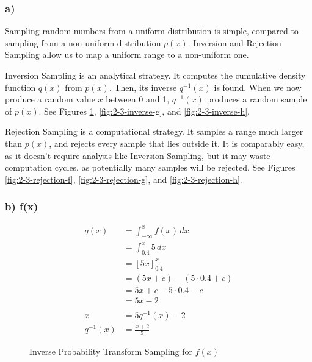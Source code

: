 \subsubsection*{a)}

Sampling random numbers from a uniform distribution is simple, compared to sampling from a non-uniform distribution $p(x)$. Inversion and Rejection Sampling allow us to map a uniform range to a non-uniform one.

Inversion Sampling is an analytical strategy. It computes the cumulative density function $q(x)$ from $p(x)$. Then, its inverse $q^{-1}(x)$ is found. When we now produce a random value $x$ between 0 and 1, $q^{-1}(x)$ produces a random sample of $p(x)$. See Figures \ref{fig:2-3-inverse-f}, \ref{fig:2-3-inverse-g}, and \ref{fig:2-3-inverse-h}.

Rejection Sampling is a computational strategy. It samples a range much larger than $p(x)$, and rejects every sample that lies outside it. It is comparably easy, as it doesn't require analysis like Inversion Sampling, but it may waste computation cycles, as potentially many samples will be rejected. See Figures \ref{fig:2-3-rejection-f}, \ref{fig:2-3-rejection-g}, and \ref{fig:2-3-rejection-h}.

\subsubsection*{b) f(x)}

\begin{align}
q(x)
&= \int_{-\infty}^x f(x)\,dx \\
&= \int_{0.4}^x 5\,dx \\
&= \left[5x\right]_{0.4}^{x} \\
&= (5x + c) - (5 \cdot 0.4 + c) \\
&= 5x + c - 5 \cdot 0.4 - c \\
&= 5x - 2 \\
\\
x &= 5 q^{-1}(x) -2 \\
q^{-1}(x) &= \frac{x+2}{5}
\end{align}

\begin{figure}[htbp]
    \centering
    
    \caption{Inverse Probability Transform Sampling for $f(x)$}
    \label{fig:2-3-inverse-f}
\end{figure}

